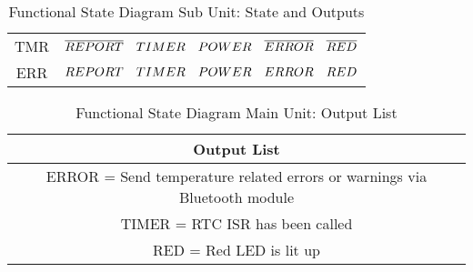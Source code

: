 \begin{center}
\begin{table}[h!]
\begin{tabular}{c|c}
    TMR&$\overline{REPORT}\hbox{  }\hbox{  }\hbox{  }TIMER\hbox{  }\hbox{  }\hbox{  }POWER\hbox{ }\hbox{  }\hbox{  }\overline{ERROR}\hbox{  }\hbox{  }\hbox{  }\overline{RED}$\\
    ERR&$REPORT\hbox{  }\hbox{  }\hbox{  }TIMER\hbox{  }\hbox{  }\hbox{  }POWER\hbox{ }\hbox{  }\hbox{  }ERROR\hbox{  }\hbox{  }\hbox{  }RED$\\
  \end{tabular}
  \caption{Functional State Diagram Sub Unit: State and Outputs}
  \label{fig:fsd-sub-state-outputs}
\end{table}
\begin{table}[h!]
  \begin{tabular}{|c|}
    \hline
    Output List\\
    \hline
    ERROR = Send temperature related errors or warnings via Bluetooth module\\
    TIMER = RTC ISR has been called\\
    RED = Red LED is lit up\\
    \hline
  \end{tabular}
  \caption{Functional State Diagram Main Unit: Output List}
  \label{fig:fsd-sub-output-list}
\end{table}
\end{center}
